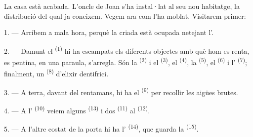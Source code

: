 %
%

\VUsaut{6.0mm}
\VUsaut{1.4mm}
\VUsaut{0.4mm}
\VUsaut{2.2mm}

La casa està acabada. L'oncle de Joan s'ha instal·lat al seu nou habitatge, la distribució del
qual ja coneixem. Vegem ara com l'ha moblat. Visitarem primer:

\VUsaut{3.0mm}

1. --- Arribem a mala hora, perquè la criada està ocupada netejant l'.

2. --- Damunt el  \textsuperscript{(1)} hi ha escampats els diferents
objectes amb què hom es renta, es pentina, en una paraula, s'arregla. Són la
 \textsuperscript{(2)} i el  \textsuperscript{(3)}, el
 \textsuperscript{(4)}, la
 \textsuperscript{(5)}, el  \textsuperscript{(6)} i
l' \textsuperscript{(7)}; finalment, un  \textsuperscript{(8)}
d'elixir dentifrici.

3. --- A terra, davant del rentamans, hi ha el  \textsuperscript{(9)} per
recollir les aigües brutes.

4. --- A l' \textsuperscript{(10)} veiem alguns
 \textsuperscript{(13)} i dos 
\textsuperscript{(11)} al  \textsuperscript{(12)}.

5. --- A l'altre costat de la porta hi ha l' \textsuperscript{(14)},
que guarda la  \textsuperscript{(15)}.

